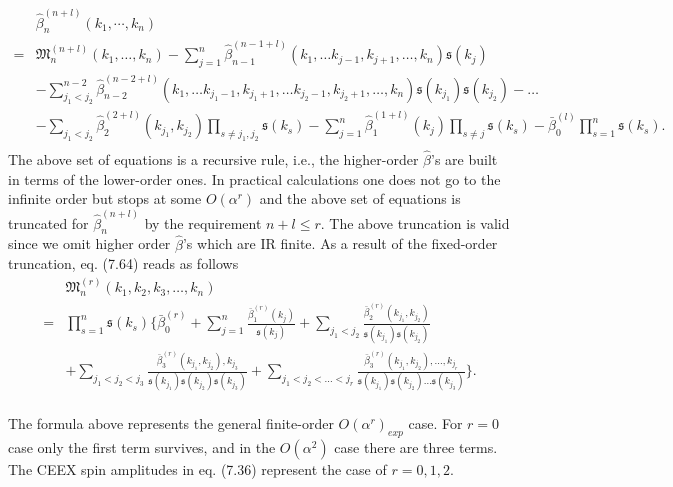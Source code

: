 \begin{align}
&\hat{\beta}^{(n+l)}_n(k_1,\cdots,k_n)\nonumber\\
=&\mathfrak{M}^{(n+l)}_n(k_1,\ldots,k_n)-\sum_{j=1}^{n}\hat{\beta}^{(n-1+l)}_{n-1}(k_1,\ldots k_{j-1},k_{j+1},\ldots,k_n)\mathfrak{s}(k_j)\nonumber\\
&-\sum_{j_1<j_2}^{n-2}\hat{\beta}^{(n-2+l)}_{n-2}(k_1,\ldots k_{{j_1}-1},k_{{j_1}+1},\ldots k_{j_2-1},k_{j_2+1},\ldots,k_n)\mathfrak{s}(k_{j_1})\mathfrak{s}(k_{j_2})-\ldots\nonumber\\
&-\sum_{j_1<j_2}\hat{\beta}^{(2+l)}_2(k_{j_1},k_{j_2})\prod_{s\neq j_1,j_2}\mathfrak{s}(k_s)-\sum_{j=1}^n\hat{\beta}^{(1+l)}_1(k_{j})\prod_{s\neq j}\mathfrak{s}(k_s)-\bar{\beta}^{(l)}_0\prod^n_{s=1}\mathfrak{s}(k_s).\nonumber\\
\end{align}
The above set of equations is a recursive rule, i.e., the higher-order $\hat{\beta}$'s are built in terms of the lower-order ones. In practical calculations one does not go to the infinite order but stops at some $O(\alpha^r)$ and the above set of equations is truncated for $\hat{\beta}^{(n+l)}_n$ by the requirement $n+l\leq r$. The above truncation is valid since we omit higher order $\hat{\beta}$'s which are IR finite. As a result of the fixed-order truncation, eq. (7.64) reads as follows
\begin{align}
&\mathfrak{M}^{(r)}_n(k_1,k_2,k_3,\ldots,k_n)\nonumber\\
=&\prod_{s=1}^{n}\mathfrak{s}(k_s)\biggl\{ \bar{\beta}^{(r)}_0+\sum_{j=1}^n\frac{\bar{\beta}^{(r)}_1(k_j)}{\mathfrak{s}(k_j)}+\sum_{j_1<j_2}\frac{\bar{\beta}^{(r)}_2(k_{j_1},k_{j_2})}{\mathfrak{s}(k_{j_1})\mathfrak{s}(k_{j_2})}\nonumber\\
& +\sum_{j_1<j_2<j_3}\frac{\bar{\beta}^{(r)}_3(k_{j_1},k_{j_2}),k_{j_3}}{\mathfrak{s}(k_{j_1})\mathfrak{s}(k_{j_2})\mathfrak{s}(k_{j_3})}+\sum_{j_1<j_2<\ldots<j_r}\frac{\bar{\beta}^{(r)}_3(k_{j_1},k_{j_2}),\ldots,k_{j_r}}{\mathfrak{s}(k_{j_1})\mathfrak{s}(k_{j_2})\ldots\mathfrak{s}(k_{j_3})} \biggr\}.\nonumber\\
\end{align}

The formula above represents the general finite-order $O(\alpha^r)_{exp}$ case.  For $r=0$ case only the first term survives, and in the $O(\alpha^2)$ case there are three terms. The CEEX spin amplitudes in eq. (7.36) represent the case of $r=0,1,2$. 

